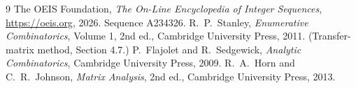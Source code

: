\documentclass[11pt,a4paper]{article}
\theoremstyle{plain}
\theoremstyle{definition}
\begin{document}
\begin{thebibliography}{9}
 The OEIS Foundation, \emph{The On-Line Encyclopedia of Integer
Sequences}, \url{https://oeis.org}, 2026. Sequence A234326.
 R.~P.~Stanley, \emph{Enumerative Combinatorics}, Volume 1, 2nd ed.,
Cambridge University Press, 2011. (Transfer-matrix method, Section 4.7.)
 P.~Flajolet and R.~Sedgewick, \emph{Analytic Combinatorics}, Cambridge
University Press, 2009.
 R.~A.~Horn and C.~R.~Johnson, \emph{Matrix Analysis}, 2nd ed., Cambridge
University Press, 2013.
\end{thebibliography}
\end{document}
